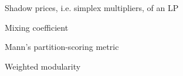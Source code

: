 
\item[$\bm{\lambda}$] Shadow prices, i.e. simplex multipliers, of an LP
\item[$\mu$] Mixing coefficient

\item[$M$] Mann's partition-scoring metric
\item[$Q^W$] Weighted modularity~\cite{newman2006modularity}